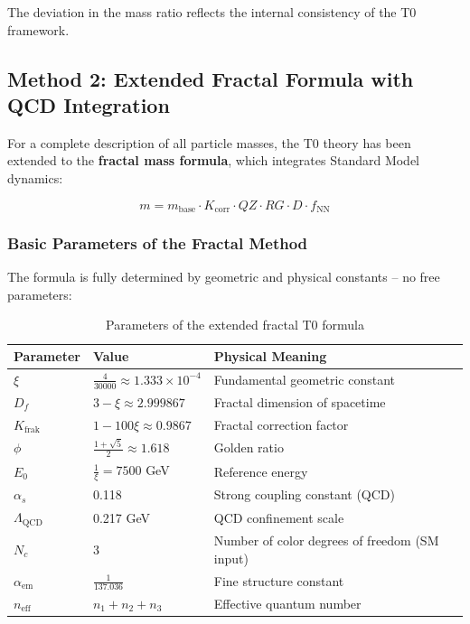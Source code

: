 	The deviation in the mass ratio reflects the internal consistency of the T0 framework.

	\subsection{Method 2: Extended Fractal Formula with QCD Integration}
	
	For a complete description of all particle masses, the T0 theory has been extended to the \textbf{fractal mass formula}, which integrates Standard Model dynamics:
	
	\begin{equation}
		\boxed{m = m_{\text{base}} \cdot K_{\text{corr}} \cdot QZ \cdot RG \cdot D \cdot f_{\text{NN}}}
		\label{eq:t0_fractal_mass}
	\end{equation}
	
	\subsubsection{Basic Parameters of the Fractal Method}
	
	The formula is fully determined by geometric and physical constants -- no free parameters:
	
	\begin{table}[h]
		\centering
		\small
		\begin{tabular}{lll}
			\toprule
			\textbf{Parameter} & \textbf{Value} & \textbf{Physical Meaning} \\
			\midrule
			$\xi$ & $\frac{4}{30000} \approx 1.333 \times 10^{-4}$ & Fundamental geometric constant \\
			$D_f$ & $3 - \xi \approx 2.999867$ & Fractal dimension of spacetime \\
			$K_{\text{frak}}$ & $1 - 100\xi \approx 0.9867$ & Fractal correction factor \\
			$\phi$ & $\frac{1 + \sqrt{5}}{2} \approx 1.618$ & Golden ratio \\
			$E_0$ & $\frac{1}{\xi} = 7500$ GeV & Reference energy \\
			$\alpha_s$ & 0.118 & Strong coupling constant (QCD) \\
			$\Lambda_{\text{QCD}}$ & 0.217 GeV & QCD confinement scale \\
			$N_c$ & 3 & Number of color degrees of freedom (SM input) \\
			$\alpha_{\text{em}}$ & $\frac{1}{137.036}$ & Fine structure constant \\
			$n_{\text{eff}}$ & $n_1 + n_2 + n_3$ & Effective quantum number \\
			\bottomrule
		\end{tabular}
		\caption{Parameters of the extended fractal T0 formula}
		\label{tab:fractal_params}
	\end{table}
	
